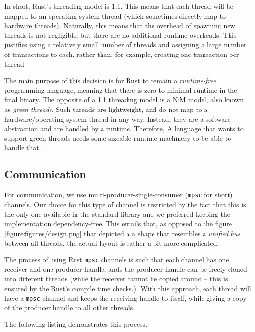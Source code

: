 In short, Rust's threading model is 1:1. This means that each thread will be mapped to an operating
system thread (which sometimes directly map to hardware threads). Naturally, this means that the
overhead of spawning new threads is not negligible, but there are no additional runtime overheads.
This justifies using a relatively small number of threads and assigning a large number of
transactions to each, rather than, for example, creating one transaction per thread.

The main purpose of this decision is for Rust to remain a \textit{runtime-free} programming
language\cite{RustJourneyAsync}, meaning that there is zero-to-minimal runtime in the final binary.
The opposite of a 1:1 threading model is a N:M model, also known as \textit{green threads}. Such
threads are lightweight, and do not map to a hardware/operating-system thread in any way. Instead,
they are a software abstraction and are handled by a runtime. Therefore, A language that wants to
support green threads needs some sizeable runtime machinery to be able to handle that.

\subsection{Communication}

For communication, we use multi-producer-single-consumer\cite{StdSyncMpsc} (\texttt{mpsc} for short)
channels. Our choice for this type of channel is restricted by the fact that this is the only one
available in the standard library and we preferred keeping the implementation dependency-free. This
entails that, as opposed to the figure \ref{figure:figures/design.png} that depicted a a shape that
resembles a \textit{unified bus} between all threads, the actual layout is rather a bit more
complicated.

The process of using Rust \texttt{mpsc} channels is such that each channel has one receiver and one
producer handle, ands the producer handle can be freely cloned into different threads (while the
receiver cannot be copied around -- this is ensured by the Rust's compile time checks.). With this
approach, each thread will have a \texttt{mpsc} channel and keeps the receiving handle to itself,
while giving a copy of the producer handle to all other threads.

The following listing demonstrates this process.

